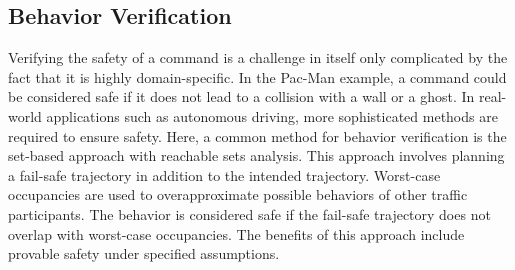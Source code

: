 \subsection{Behavior Verification}

Verifying the safety of a command is a challenge in itself only complicated by the fact that it is highly domain-specific.
In the Pac-Man example, a command could be considered safe if it does not lead to a collision with a wall or a ghost.
In real-world applications such as autonomous driving, more sophisticated methods are required to ensure safety.
Here, a common method for behavior verification is the set-based approach with reachable sets analysis.
This approach involves planning a fail-safe trajectory in addition to the intended trajectory.
Worst-case occupancies are used to overapproximate possible behaviors of other traffic participants.
The behavior is considered safe if the fail-safe trajectory does not overlap with worst-case occupancies.
The benefits of this approach include provable safety under specified assumptions.

